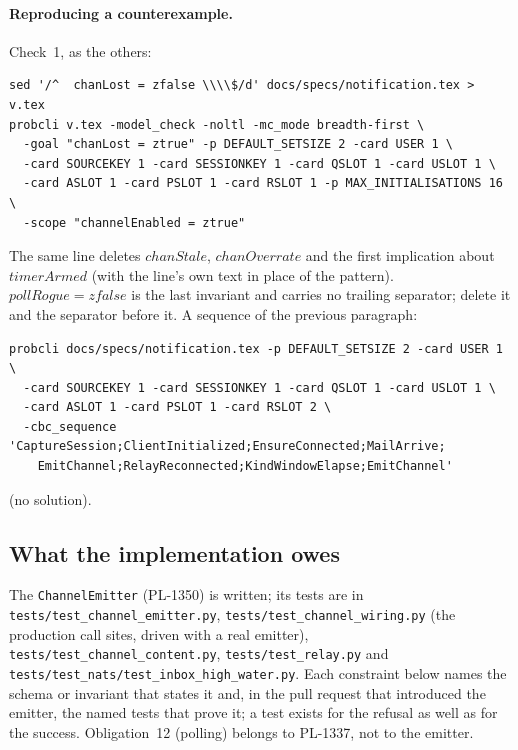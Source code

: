 \documentclass[a4paper,10pt,fleqn]{article}
\begin{document}
\paragraph{Reproducing a counterexample.}  Check~1, as the others:
\begin{verbatim}
sed '/^  chanLost = zfalse \\\\$/d' docs/specs/notification.tex > v.tex
probcli v.tex -model_check -noltl -mc_mode breadth-first \
  -goal "chanLost = ztrue" -p DEFAULT_SETSIZE 2 -card USER 1 \
  -card SOURCEKEY 1 -card SESSIONKEY 1 -card QSLOT 1 -card USLOT 1 \
  -card ASLOT 1 -card PSLOT 1 -card RSLOT 1 -p MAX_INITIALISATIONS 16 \
  -scope "channelEnabled = ztrue"
\end{verbatim}
The same line deletes $chanStale$, $chanOverrate$ and the first implication
about $timerArmed$ (with the line's own text in place of the pattern).
$pollRogue = zfalse$ is the last invariant and carries no trailing
separator; delete it and the separator before it.  A sequence of the
previous paragraph:
\begin{verbatim}
probcli docs/specs/notification.tex -p DEFAULT_SETSIZE 2 -card USER 1 \
  -card SOURCEKEY 1 -card SESSIONKEY 1 -card QSLOT 1 -card USLOT 1 \
  -card ASLOT 1 -card PSLOT 1 -card RSLOT 2 \
  -cbc_sequence 'CaptureSession;ClientInitialized;EnsureConnected;MailArrive;
    EmitChannel;RelayReconnected;KindWindowElapse;EmitChannel'
\end{verbatim}
(no solution).

\subsection{What the implementation owes}
\label{sec:chanobligations}

The \texttt{ChannelEmitter} (PL-1350) is written; its tests are in
\texttt{tests/test\_channel\_emitter.py}, \texttt{tests/test\_channel\_wiring.py}
(the production call sites, driven with a real emitter),
\texttt{tests/test\_channel\_content.py}, \texttt{tests/test\_relay.py} and
\texttt{tests/test\_nats/test\_inbox\_high\_water.py}.  Each constraint below
names the schema or invariant that states it and, in the pull request that
introduced the emitter, the named tests that prove it; a test exists for the
refusal as well as for the success.  Obligation~12 (polling) belongs to
PL-1337, not to the emitter.
\end{document}
